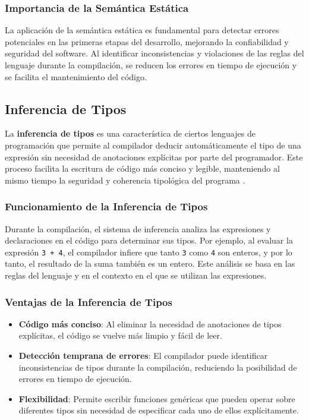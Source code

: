 \documentclass{article}
\begin{document}
  \subsubsection{Importancia de la Semántica Estática}

  La aplicación de la semántica estática es fundamental para detectar errores potenciales en las primeras etapas del desarrollo, mejorando la confiabilidad y seguridad del software. Al identificar inconsistencias y violaciones de las reglas del lenguaje durante la compilación, se reducen los errores en tiempo de ejecución y se facilita el mantenimiento del código.

  \subsection{Inferencia de Tipos}

  La \textbf{inferencia de tipos} es una característica de ciertos lenguajes de programación que permite al compilador deducir automáticamente el tipo de una expresión sin necesidad de anotaciones explícitas por parte del programador. Este proceso facilita la escritura de código más conciso y legible, manteniendo al mismo tiempo la seguridad y coherencia tipológica del programa \cite{milner1978theory}.

  \subsubsection{Funcionamiento de la Inferencia de Tipos}

  Durante la compilación, el sistema de inferencia analiza las expresiones y declaraciones en el código para determinar sus tipos. Por ejemplo, al evaluar la expresión \texttt{3 + 4}, el compilador infiere que tanto \texttt{3} como \texttt{4} son enteros, y por lo tanto, el resultado de la suma también es un entero. Este análisis se basa en las reglas del lenguaje y en el contexto en el que se utilizan las expresiones.

  \subsubsection{Ventajas de la Inferencia de Tipos}

  \begin{itemize}
    \item \textbf{Código más conciso}: Al eliminar la necesidad de anotaciones de tipos explícitas, el código se vuelve más limpio y fácil de leer.

    \item \textbf{Detección temprana de errores}: El compilador puede identificar inconsistencias de tipos durante la compilación, reduciendo la posibilidad de errores en tiempo de ejecución.

    \item \textbf{Flexibilidad}: Permite escribir funciones genéricas que pueden operar sobre diferentes tipos sin necesidad de especificar cada uno de ellos explícitamente.
  \end{itemize}
\end{document}
